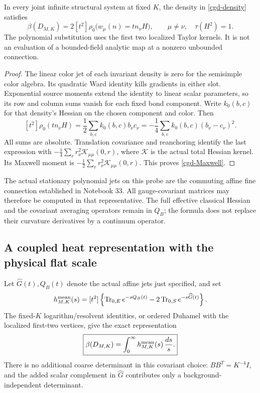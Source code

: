 \begin{proposition}
\label{cgd-density-theorem}
In every joint infinite structural system at fixed \(K\),
the density in \eqref{cgd-density} satisfies
\begin{equation}
 \beta(D_{M,K})=
    2[t^2]\rho_0\bigl(w_\mu(n)=t n_\nu H\bigr),
 \qquad \mu\ne\nu,\quad\tau(H^2)=1.
 \label{cgd-Maxwell}
\end{equation}
The polynomial substitution uses the first two localized
Taylor kernels. It is not an evaluation of a bounded-field
analytic map at a nonzero unbounded connection.
\end{proposition}

\begin{proof}
The linear color jet of each invariant density is zero
for the semisimple color algebra. Its quadratic Ward
identity kills gradients in either slot. Exponential
source moments extend the identity to linear scalar
parameters, so its row and column sums vanish for
each fixed bond component. Write \(k_0(b,c)\) for that
density's Hessian on the chosen component and color.
Then
\[
 [t^2]\rho_0(t n_\nu H)
   =\frac12\sum_{b,c}k_0(b,c)b_\nu c_\nu
   =-\frac14\sum_{b,c}k_0(b,c)(b_\nu-c_\nu)^2.
\]
All sums are absolute. Translation covariance and
reanchoring identify the last expression with
\(-\frac14\sum_r r_\nu^2\mathcal K_{\mu\mu}(0,r)\),
where \(\mathcal K\) is the actual total Hessian
kernel. Its Maxwell moment is
\(-\frac12\sum_r r_\nu^2\mathcal K_{\mu\mu}(0,r)\).
This proves \eqref{cgd-Maxwell}.
\end{proof}

The actual stationary polynomial jets on this probe
are the commuting affine fine connection established
in Notebook 33. All gauge-covariant matrices may
therefore be computed in that representative.
The full effective classical Hessian and the
covariant averaging operators remain in \(Q_B\);
the formula does not replace their curvature
derivatives by a continuum operator.

\subsection{A coupled heat representation with the physical flat scale}
\label{cgd-heat-section}

Let \(\widehat G(t),Q_B(t)\) denote the actual affine
jets just specified, and set
\begin{equation}
 h^{\rm mean}_{M,K}(s)
  =[t^2]\left\{
    \operatorname{Tr}_{0,E}e^{-sQ_B(t)}
             -2\operatorname{Tr}_{0,S}e^{-s\widehat G(t)}
         \right\}.
 \label{cgd-heat-coefficient}
\end{equation}
The fixed-\(K\) logarithm/resolvent identities, or
ordered Duhamel with the localized first-two vertices,
give the exact representation
\begin{equation}
 \boxed{\displaystyle
     \beta(D_{M,K})=
        \int_0^\infty h^{\rm mean}_{M,K}(s)\,\frac{ds}{s}.}
 \label{cgd-heat-identity}
\end{equation}
There is no additional coarse determinant in this
covariant choice: \(BB^T=K^{-4}I\), and the added
scalar complement in \(\widehat G\) contributes only
a background-independent determinant.

